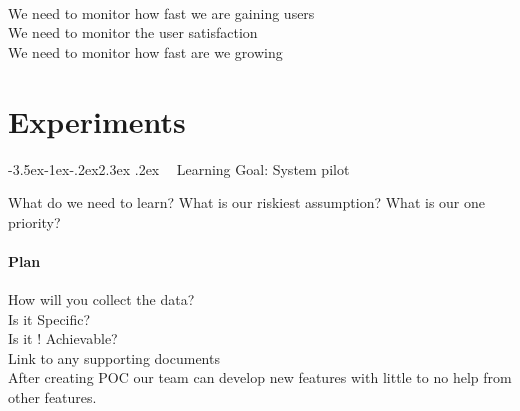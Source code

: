 \documentclass[12pt,a4paper,twoside]{article}
\makeatletter
\def\section{\@startsection{section}{1}{\z@ }%
  {-3.5ex\@plus -1ex\@minus -.2ex}{2.3ex \@plus .2ex}%
  {\noindent\normalfont \Large \bfseries \ }%
}
\makeatother
\begin{document}
\label{channels}
\label{channels:1}
\label{channels:2}

\label{revenue}
\label{revenue:1}
\label{revenue:2}
\label{revenue:3}
\label{revenue:4}
\label{revenue:5}
\label{revenue:6}

\label{cost}
\label{cost:1}
\label{cost:2}

\label{metrics}
\label{metrics:2}
\secstarter
{}\label{metrics:2:1}\\
We need to monitor how fast we are gaining users
\label{metrics:2:2}\\
We need to monitor the user satisfaction
\label{metrics:2:3}\\
We need to monitor how fast are we growing 
\secend

\label{relation}
\label{relation:3}
\label{relation:1} 
\label{relation:2}




\newpage

\part{Experiments}
\section{Learning Goal: System pilot}

What do we need to learn?
What is our riskiest assumption?
What is our one priority?

\subsection{Plan}
How will you collect the data?\\
Is it Specific?\\
Is it ! Achievable?\\
Link to any supporting documents\\

After creating POC our team can develop new features with little to no help from other features.
\end{document}
